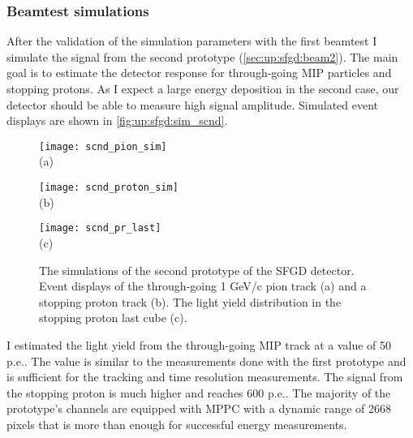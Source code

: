 \documentclass[main.tex]{subfiles}
\begin{document}
\subsubsection{Beamtest simulations}
After the validation of the simulation parameters with the first beamtest I simulate the signal from the second prototype (\autoref{sec:up:sfgd:beam2}). The main goal is to estimate the detector response for through-going MIP particles and stopping protons. As I expect a large energy deposition in the second case, our detector should be able to measure high signal amplitude. Simulated event displays are shown in \autoref{fig:up:sfgd:sim_scnd}.

\begin{figure}[!ht]
	\centering
	\begin{minipage}{0.33\linewidth}
		\centering
		\texttt{[image: scnd\_pion\_sim]} \\ (a)
	\end{minipage}
	\begin{minipage}{0.33\linewidth}
		\centering
		\texttt{[image: scnd\_proton\_sim]} \\ (b)
	\end{minipage}
	\begin{minipage}{0.33\linewidth}
		\centering
		\texttt{[image: scnd\_pr\_last]} \\ (c)
	\end{minipage}
	\caption{The simulations of the second prototype of the SFGD detector. Event displays of the through-going 1 GeV/c pion track (a) and a stopping proton track (b). The light yield distribution in the stopping proton last cube (c).}
	\label{fig:up:sfgd:sim_scnd}
\end{figure}

I estimated the light yield from the through-going MIP track at a value of 50 p.e.. The value is similar to the measurements done with the first prototype and is sufficient for the tracking and time resolution measurements. The signal from the stopping proton is much higher and reaches 600 p.e.. The majority of the prototype's channels are equipped with MPPC with a dynamic range of 2668 pixels that is more than enough for successful energy measurements.
\end{document}

